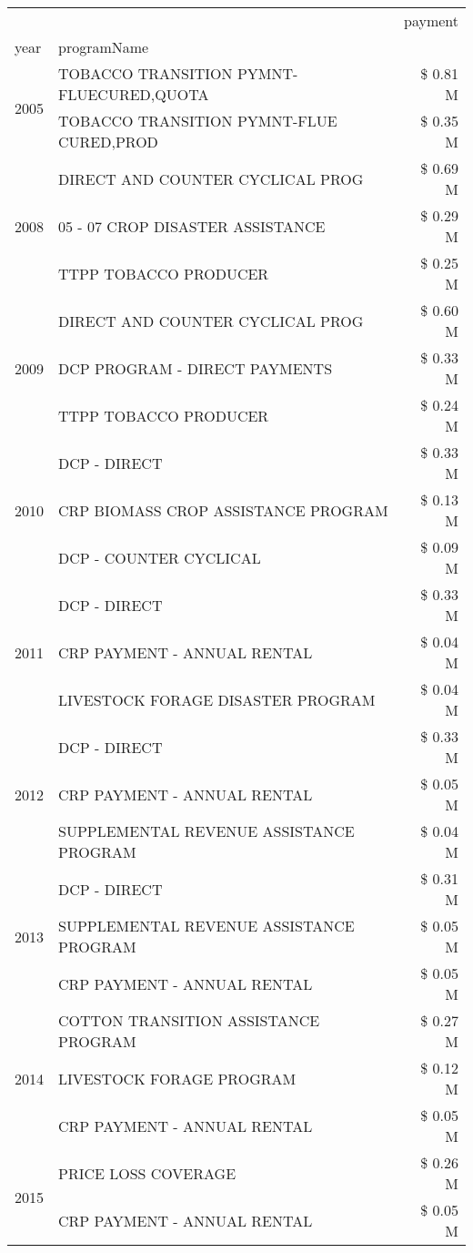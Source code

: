 \begin{tabular}{llr}
\toprule
 &  & payment \\
year & programName &  \\
\midrule
\multirow[t]{2}{*}{2005} & TOBACCO TRANSITION PYMNT-FLUECURED,QUOTA & \$ 0.81 M \\
 & TOBACCO TRANSITION PYMNT-FLUE CURED,PROD & \$ 0.35 M \\
\cline{1-3}
\multirow[t]{3}{*}{2008} & DIRECT AND COUNTER CYCLICAL PROG & \$ 0.69 M \\
 & 05 - 07 CROP DISASTER ASSISTANCE & \$ 0.29 M \\
 & TTPP TOBACCO PRODUCER & \$ 0.25 M \\
\cline{1-3}
\multirow[t]{3}{*}{2009} & DIRECT AND COUNTER CYCLICAL PROG & \$ 0.60 M \\
 & DCP PROGRAM - DIRECT PAYMENTS & \$ 0.33 M \\
 & TTPP TOBACCO PRODUCER & \$ 0.24 M \\
\cline{1-3}
\multirow[t]{3}{*}{2010} & DCP - DIRECT & \$ 0.33 M \\
 & CRP BIOMASS CROP ASSISTANCE PROGRAM & \$ 0.13 M \\
 & DCP - COUNTER CYCLICAL & \$ 0.09 M \\
\cline{1-3}
\multirow[t]{3}{*}{2011} & DCP - DIRECT & \$ 0.33 M \\
 & CRP PAYMENT - ANNUAL RENTAL & \$ 0.04 M \\
 & LIVESTOCK FORAGE DISASTER PROGRAM & \$ 0.04 M \\
\cline{1-3}
\multirow[t]{3}{*}{2012} & DCP - DIRECT & \$ 0.33 M \\
 & CRP PAYMENT - ANNUAL RENTAL & \$ 0.05 M \\
 & SUPPLEMENTAL REVENUE ASSISTANCE PROGRAM & \$ 0.04 M \\
\cline{1-3}
\multirow[t]{3}{*}{2013} & DCP - DIRECT & \$ 0.31 M \\
 & SUPPLEMENTAL REVENUE ASSISTANCE PROGRAM & \$ 0.05 M \\
 & CRP PAYMENT - ANNUAL RENTAL & \$ 0.05 M \\
\cline{1-3}
\multirow[t]{3}{*}{2014} & COTTON TRANSITION ASSISTANCE PROGRAM & \$ 0.27 M \\
 & LIVESTOCK FORAGE PROGRAM & \$ 0.12 M \\
 & CRP PAYMENT - ANNUAL RENTAL & \$ 0.05 M \\
\cline{1-3}
\multirow[t]{3}{*}{2015} & PRICE LOSS COVERAGE & \$ 0.26 M \\
 & CRP PAYMENT - ANNUAL RENTAL & \$ 0.05 M \\

\end{tabular}
